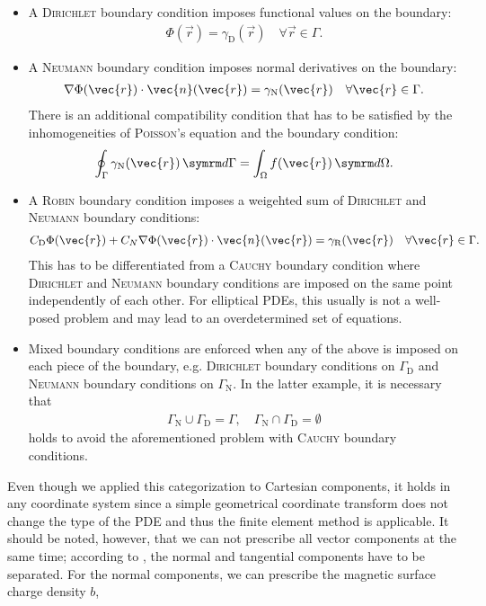 \begin{itemize}
\item A \textsc{Dirichlet} boundary condition imposes functional values on the boundary:
  \begin{gather*}
    \Phi (\vec{r}) = \gamma_{\text{D}} (\vec{r}) \quad \forall \vec{r} \in \Gamma.
  \end{gather*}
\item A \textsc{Neumann} boundary condition imposes normal derivatives on the boundary:
  \begin{gather*}
    \grad \Phi (\vec{r}) \cdot \vec{n} (\vec{r}) = \gamma_{\text{N}} (\vec{r}) \quad \forall \vec{r} \in \Gamma.
  \end{gather*}
  There is an additional compatibility condition that has to be satisfied by the inhomogeneities of \textsc{Poisson}'s equation and the boundary condition:
  \begin{gather*}
    \oint_{\Gamma} \gamma_{\text{N}} (\vec{r}) \, \diff \Gamma = \int_{\Omega} f (\vec{r}) \, \diff \Omega.
  \end{gather*}
\item A \textsc{Robin} boundary condition imposes a weigehted sum of \textsc{Dirichlet} and \textsc{Neumann} boundary conditions:
  \begin{gather*}
    C_{\text{D}} \Phi (\vec{r}) + C_{N} \grad \Phi (\vec{r}) \cdot \vec{n} (\vec{r}) = \gamma_{\text{R}} (\vec{r}) \quad \forall \vec{r} \in \Gamma.
  \end{gather*}
  This has to be differentiated from a \textsc{Cauchy} boundary condition where \textsc{Dirichlet} and \textsc{Neumann} boundary conditions are imposed on the same point independently of each other. For elliptical PDEs, this usually is not a well-posed problem and may lead to an overdetermined set of equations.
\item Mixed boundary conditions are enforced when any of the above is imposed on each piece of the boundary, e.g. \textsc{Dirichlet} boundary conditions on $\Gamma_{\text{D}}$ and \textsc{Neumann} boundary conditions on $\Gamma_{\text{N}}$. In the latter example, it is necessary that
  \begin{gather*}
    \Gamma_{\text{N}} \cup \Gamma_{\text{D}} = \Gamma, \quad \Gamma_{\text{N}} \cap \Gamma_{\text{D}} = \emptyset
  \end{gather*}
  holds to avoid the aforementioned problem with \textsc{Cauchy} boundary conditions.
\end{itemize}
Even though we applied this categorization to Cartesian components, it holds in any coordinate system since a simple geometrical coordinate transform does not change the type of the PDE and thus the finite element method is applicable. It should be noted, however, that we can not prescribe all vector components at the same time; according to \textcite{Biro15}, the normal and tangential components have to be separated. For the normal components, we can prescribe the magnetic surface charge density $b$,
